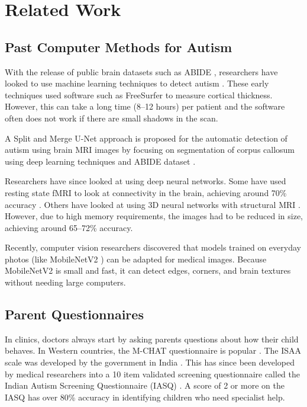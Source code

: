\documentclass[conference]{IEEEtran}
\begin{document}
\section{Related Work}

\subsection{Past Computer Methods for Autism}
With the release of public brain datasets such as ABIDE \cite{gkintoni2025}, researchers have looked to use machine learning techniques to detect autism \cite{rathod2026, mathkor2026}. These early techniques used software such as FreeSurfer to measure cortical thickness. However, this can take a long time (8--12 hours) per patient and the software often does not work if there are small shadows in the scan.

A Split and Merge U-Net approach is proposed for the automatic detection of autism using brain MRI images by focusing on segmentation of corpus callosum using deep learning techniques and ABIDE dataset \cite{nagashree2024}.

Researchers have since looked at using deep neural networks. Some have used resting state fMRI to look at connectivity in the brain, achieving around 70\% accuracy \cite{shankari2026, munoz2026}. Others have looked at using 3D neural networks with structural MRI \cite{polavarapu2026}. However, due to high memory requirements, the images had to be reduced in size, achieving around 65--72\% accuracy.

Recently, computer vision researchers discovered that models trained on everyday photos (like MobileNetV2 \cite{anyom2025}) can be adapted for medical images. Because MobileNetV2 is small and fast, it can detect edges, corners, and brain textures without needing large computers.

\subsection{Parent Questionnaires}
In clinics, doctors always start by asking parents questions about how their child behaves. In Western countries, the M-CHAT questionnaire is popular \cite{vignapiano2025}. The ISAA scale was developed by the government in India \cite{xu2025}. This has since been developed by medical researchers into a 10 item validated screening questionnaire called the Indian Autism Screening Questionnaire (IASQ) \cite{wakelin2026}. A score of 2 or more on the IASQ has over 80\% accuracy in identifying children who need specialist help.
\end{document}
